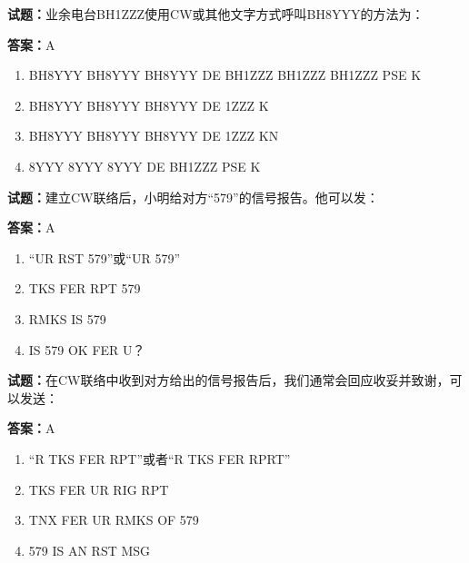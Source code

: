 \documentclass{ctexbook}
\begin{document}




\vspace{1em}

\textbf{试题：}业余电台BH1ZZZ使用CW或其他文字方式呼叫BH8YYY的方法为： 

\textbf{答案：}A 

\begin{enumerate}[leftmargin=3em]
  \item BH8YYY BH8YYY BH8YYY DE BH1ZZZ BH1ZZZ BH1ZZZ PSE K 


  \item BH8YYY BH8YYY BH8YYY DE 1ZZZ K 

  \item BH8YYY BH8YYY BH8YYY DE 1ZZZ KN 

  \item 8YYY 8YYY 8YYY DE BH1ZZZ PSE K 

\end{enumerate}





\vspace{1em}

\textbf{试题：}建立CW联络后，小明给对方“579”的信号报告。他可以发： 

\textbf{答案：}A 

\begin{enumerate}[leftmargin=3em]
  \item “UR RST 579”或“UR 579” 

  \item TKS FER RPT 579 

  \item RMKS IS 579 

  \item IS 579 OK FER U？ 

\end{enumerate}





\vspace{1em}

\textbf{试题：}在CW联络中收到对方给出的信号报告后，我们通常会回应收妥并致谢，可以发送： 

\textbf{答案：}A 

\begin{enumerate}[leftmargin=3em]
  \item “R TKS FER RPT”或者“R TKS FER RPRT” 

  \item TKS FER UR RIG RPT 

  \item TNX FER UR RMKS OF 579 

  \item 579 IS AN RST MSG 

\end{enumerate}
\end{document}
